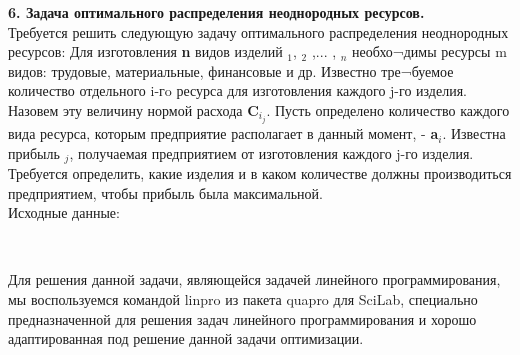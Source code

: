 \documentclass[russian,utf8,nocolumnxxxi,nocolumnxxxii]{eskdtext}
\begin{document}
{\bf6. Задача оптимального распределения неоднородных ресурсов.}\\
Требуется решить следующую задачу оптимального распределения неоднородных ресурсов: Для изготовления {\bf n} видов изделий {$_1$}, {$_2$} ,... , {$_n$} необхо¬димы ресурсы m видов: трудовые, материальные, финансовые и др. Известно тре¬буемое количество отдельного i-гo ресурса для изготовления каждого j-го изделия. Назовем эту величину нормой расхода {\bf C$_i_j$}. Пусть определено количество каждого вида ресурса, которым предприятие располагает в данный момент, - {\bf a$_i$}. Известна прибыль {$_j$}, получаемая предприятием от изготовления каждого j-го изделия. Требуется определить, какие изделия и в каком количестве должны производиться предприятием, чтобы прибыль была максимальной.  \\
Исходные данные:\\
\begin{figure}[H]
\begin{center}
\begin{minipage}[h]{0.75\linewidth}
  \\
\end{minipage}
\end{center}
\end{figure}

Для решения данной задачи, являющейся задачей линейного программирования, мы воспользуемся командой linpro из пакета quapro для SciLab, специально предназначенной для решения задач линейного программирования и хорошо адаптированная под решение данной задачи оптимизации.\\
\end{document}
